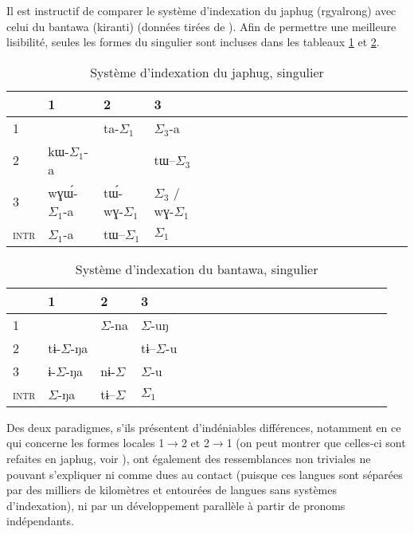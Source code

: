 \documentclass[oldfontcommands,oneside,a4paper,11pt]{article}
\newcommand{\ipa}[1]{{\phon \mbox{#1}}} %
\newcommand{\grise}[1]{\cellcolor{lightgray}\textbf{#1}}
\newcommand{\ra}{$\Sigma_1$}
\newcommand{\rc}{$\Sigma_3$}
\newcommand{\ro}{$\Sigma$}
\begin{document}
 

Il est instructif de comparer le système d'indexation du japhug (rgyalrong) avec celui du bantawa (kiranti) (données tirées de \citealt{jacques10inverse, doornenbal09}). Afin de permettre une meilleure lisibilité, seules les formes du singulier sont incluses dans les tableaux \ref{tab:japhug} et \ref{tab:bantawa}.

 

\begin{table}[H]
\caption{Système d'indexation du japhug, singulier} \centering \label{tab:japhug}
\begin{tabular}{l|lllllllllllllllllll}
\toprule
&1 & 2 &3 &\\
\midrule
1 &\grise{}&\ipa{ta}-\ra{} & \rc{}-\ipa{a}	 \\
2 &\ipa{kɯ}-\ra{}-\ipa{a}	 &\grise{} &\ipa{tɯ--}\rc{} \\
3 &\ipa{wɣɯ́-}\ra{}-\ipa{a}&\ipa{tɯ́-wɣ-}\ra{}& \rc{} / \ipa{wɣ}-\ra{}\\
\midrule
\textsc{intr} & \ra{}-\ipa{a}&\ipa{tɯ--}\ra{}&\ra{} \\
\bottomrule
\end{tabular}
\end{table}

\begin{table}[H]
\caption{Système d'indexation du bantawa, singulier} \centering \label{tab:bantawa}
\begin{tabular}{l|lllllllllllllllllll}
\toprule
&1 & 2 &3 &\\
\midrule
1 &\grise{}& \ro{}-\ipa{na} & \ro{}-\ipa{uŋ}	 \\
2 &\ipa{tɨ-}\ro{}-\ipa{ŋa} &\grise{} &\ipa{tɨ--}\ro{}-\ipa{u}\\
3 &\ipa{ɨ-}\ro{}-\ipa{ŋa}&\ipa{nɨ-}\ro{}& \ro{}-\ipa{u}\\
\midrule
\textsc{intr} & \ro{}-\ipa{ŋa}&\ipa{tɨ--}\ro{}&\ra{} \\
\bottomrule
\end{tabular}
\end{table}

Des deux paradigmes, s'ils présentent d'indéniables différences, notamment en ce qui concerne les formes locales 1$\rightarrow$2 et 2$\rightarrow$1 (on peut montrer que celles-ci sont refaites en japhug, voir \citealt{jacques15generic}), ont également des ressemblances non triviales ne pouvant s'expliquer ni comme dues au contact (puisque ces langues sont séparées par des milliers de kilomètres et entourées de langues sans systèmes d'indexation), ni par un développement parallèle à partir de pronoms indépendants.
\end{document}
